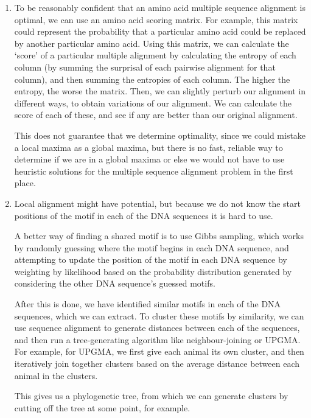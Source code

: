 


\begin{enumerate}[label=(\alph*)]
  \item
    To be reasonably confident that an amino acid multiple sequence alignment is optimal, we can use an amino acid scoring matrix. For example, this matrix could represent the probability that a particular amino acid could be replaced by another particular amino acid. Using this matrix, we can calculate the `score' of a particular multiple alignment by calculating the entropy of each column (by summing the surprisal of each pairwise alignment for that column), and then summing the entropies of each column. The higher the entropy, the worse the matrix. Then, we can slightly perturb our alignment in different ways, to obtain variations of our alignment. We can calculate the score of each of these, and see if any are better than our original alignment.

    This does not guarantee that we determine optimality, since we could mistake a local maxima as a global maxima, but there is no fast, reliable way to determine if we are in a global maxima or else we would not have to use heuristic solutions for the multiple sequence alignment problem in the first place.

  \item

    Local alignment might have potential, but because we do not know the start positions of the motif in each of the DNA sequences it is hard to use.

    A better way of finding a shared motif is to use Gibbs sampling, which works by randomly guessing where the motif begins in each DNA sequence, and attempting to update the position of the motif in each DNA sequence by weighting by likelihood based on the probability distribution generated by considering the other DNA sequence's guessed motifs.

    After this is done, we have identified similar motifs in each of the DNA sequences, which we can extract. To cluster these motifs by similarity, we can use sequence alignment to generate distances between each of the sequences, and then run a tree-generating algorithm like neighbour-joining or UPGMA. For example, for UPGMA, we first give each animal its own cluster, and then iteratively join together clusters based on the average distance between each animal in the clusters.

    This gives us a phylogenetic tree, from which we can generate clusters by cutting off the tree at some point, for example.


\end{enumerate}
